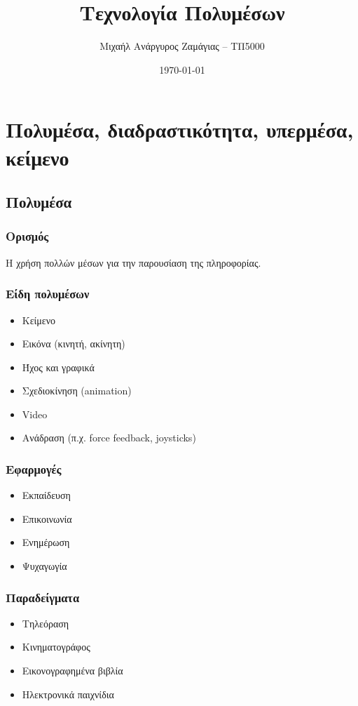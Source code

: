 \documentclass[12pt]{report}
\title{Τεχνολογία Πολυμέσων}
\author{Μιχαήλ Ανάργυρος Ζαμάγιας -- ΤΠ5000}
\date{\today}
\begin{document}
\maketitle

\tableofcontents

\chapter{Πολυμέσα, διαδραστικότητα, υπερμέσα, κείμενο}
\newpage
\section{Πολυμέσα}
\begin{multicols*}{2}
    \subsection{Ορισμός}
    Η χρήση πολλών μέσων για την παρουσίαση της πληροφορίας.
    \subsection{Είδη πολυμέσων}
    \begin{itemize}
        \item Κείμενο
        \item Εικόνα (κινητή, ακίνητη)
        \item Ήχος και γραφικά
        \item Σχεδιοκίνηση (\textlatin{animation})
        \item \textlatin{Video}
        \item Ανάδραση (π.χ. \textlatin{force feedback, joysticks})
    \end{itemize}
    \subsection{Εφαρμογές}
    \begin{itemize}
        \item Εκπαίδευση
        \item Επικοινωνία
        \item Ενημέρωση
        \item Ψυχαγωγία
    \end{itemize}
    \subsection{Παραδείγματα}
    \begin{itemize}
        \item Τηλεόραση
        \item Κινηματογράφος
        \item Εικονογραφημένα βιβλία
        \item Ηλεκτρονικά παιχνίδια
    \end{itemize}

\end{multicols*}
\end{document}
